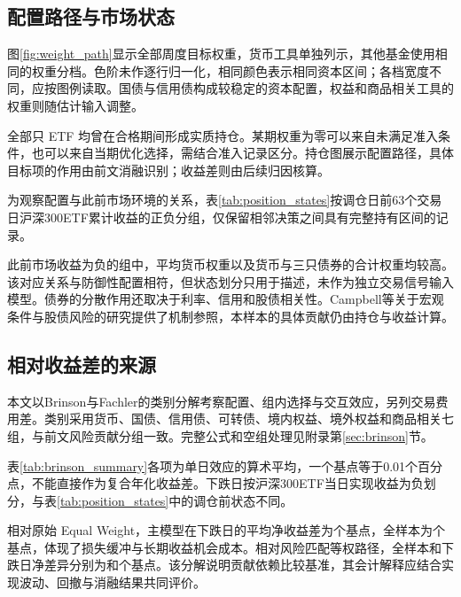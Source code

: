 \subsection{配置路径与市场状态}
\label{sec:positions}
图\ref{fig:weight_path}显示全部周度目标权重，货币工具单独列示，其他基金使用相同的权重分档。色阶未作逐行归一化，相同颜色表示相同资本区间；各档宽度不同，应按图例读取。国债与信用债构成较稳定的资本配置，权益和商品相关工具的权重则随估计输入调整。

\FloatBarrier

全部\primaryAssetsUsed{}只 ETF 均曾在合格期间形成实质持仓。某期权重为零可以来自未满足准入条件，也可以来自当期优化选择，需结合准入记录区分。持仓图展示配置路径，具体目标项的作用由前文消融识别；收益差则由后续归因核算。

为观察配置与此前市场环境的关系，表\ref{tab:position_states}按调仓日前63个交易日沪深300ETF累计收益的正负分组，仅保留相邻决策之间具有完整持有区间的记录。
\begin{table}[htbp]\centering
\caption{调仓前市场状态与Global RRP目标权重}\label{tab:position_states}
\fitthesistable{}
\end{table}

此前市场收益为负的组中，平均货币权重以及货币与三只债券的合计权重均较高。该对应关系与防御性配置相符，但状态划分只用于描述，未作为独立交易信号输入模型。债券的分散作用还取决于利率、信用和股债相关性。Campbell等关于宏观条件与股债风险的研究提供了机制参照\cite{campbell2020macro}，本样本的具体贡献仍由持仓与收益计算。

\subsection{相对收益差的来源}
本文以Brinson与Fachler的类别分解考察配置、组内选择与交互效应\cite{brinson1985measuring}，另列交易费用差。类别采用货币、国债、信用债、可转债、境内权益、境外权益和商品相关七组，与前文风险贡献分组一致。完整公式和空组处理见附录第\ref{sec:brinson}节。

\begin{table}[htbp]\centering
\caption{Brinson与Fachler归因的平均单日贡献（基点）}\label{tab:brinson_summary}
\fitthesistable{}
\end{table}

表\ref{tab:brinson_summary}各项为单日效应的算术平均，一个基点等于0.01个百分点，不能直接作为复合年化收益差。下跌日按沪深300ETF当日实现收益为负划分，与表\ref{tab:position_states}中的调仓前状态不同。

相对原始 Equal Weight，主模型在下跌日的平均净收益差为\attrEqualNetDown{}个基点，全样本为\attrEqualNetAll{}个基点，体现了损失缓冲与长期收益机会成本。相对风险匹配等权路径，全样本和下跌日净差异分别为\attrMatchedNetAll{}和\attrMatchedNetDown{}个基点。该分解说明贡献依赖比较基准，其会计解释应结合实现波动、回撤与消融结果共同评价。
\FloatBarrier

